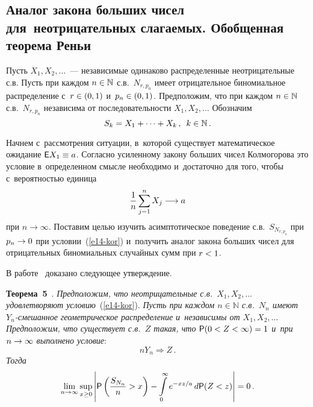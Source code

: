 \begin{multicols}{2}
\subsection{Аналог закона больших чисел для~неотрицательных слагаемых. 
Обобщенная теорема Реньи}

Пусть $X_1,X_2,\ldots$~--- независимые одинаково распределенные
неотрицательные с.в. Пусть при каж\-дом $n\hm\in\mathbb{N}$ с.в.\
$N_{r,p_n}$ имеет отрицательное биномиальное распределение 
с~$r\hm\in(0,1)$ и~$p_n\hm\in(0,1)$. Предположим, что при каждом
$n\hm\in\mathbb{N}$ с.в.~$N_{r,p_n}$ независима от последовательности
$X_1,X_2,\ldots$ Обозначим
$$
S_k=X_1+\cdots+X_k\,,\enskip k\in\mathbb{N}\,.
$$

Начнем с~рассмотрения ситуации, в~которой существует математическое
ожидание ${\sf E}X_1\hm\equiv a$. Соглас\-но усиленному закону больших
чисел Колмогорова это условие в~определенном смысле необходимо 
и~достаточно для того, чтобы с~ве\-ро\-ят\-ностью единица
\begin{equation}
\displaystyle\frac{\displaystyle 1\mathstrut}{\displaystyle n\mathstrut}\sum\limits_{j=1}^nX_j\longrightarrow a 
\label{e14-kor}
\end{equation}
при $n\to\infty$. Поставим целью изучить асимптотическое поведение
с.в.~$S_{N_{r,p_n}}$ при $p_n\hm\to 0$ при условии~(\ref{e14-kor}) 
и~получить аналог закона больших чисел для отрицательных биномиальных
случайных сумм при $r\hm<1$.

В работе~\cite{Korolev2016TVP} доказано следующее утверждение.

\smallskip

\noindent
\textbf{Теорема~5}~\cite{Korolev2016TVP}. \textit{Предположим, что
неотрицательные с.в.\ $X_1,X_2,\ldots$ удовлетворяют условию}~(\ref{e14-kor}).
\textit{Пусть при каждом $n\in\mathbb{N}$ с.в.~$N_n$ имеют $Y_n$-сме\-шан\-ное
геометрическое распределение и~независимы от $X_1,X_2,\ldots$
Предположим, что существует с.в.~$Z$ такая, что ${\sf P}
(0\hm<Z\hm<\infty)\hm=1$ и~при $n\hm\to\infty$ выполнено условие}:
\begin{equation}
nY_n\Longrightarrow Z\,.
\label{e15-kor}
\end{equation}
\textit{Тогда}
$$
\mathop{\mathrm{lim}}\limits_{n\to\infty}\sup\limits_{x\ge0}\left\vert {\sf P}
\left(\displaystyle\frac{\displaystyle S_{N_n}\mathstrut}{\displaystyle n\mathstrut}>x\right)-\int\limits_{0}^{\infty}e^{-xz/a}\,d{\sf P}
(Z<z)\right\vert=0\,.
$$


\smallskip


\end{multicols}
